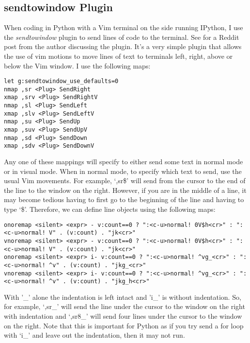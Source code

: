 \documentclass[10pt]{article}
\begin{document}
\subsection{sendtowindow Plugin}
When coding in Python with a Vim terminal on the side running IPython, I use the \textit{sendtowindow} plugin
\cite{KKPMW2016send} to send lines of code to the terminal. See \cite{KKPMW2019send} for a Reddit post from the author
discussing the plugin. It's a very simple plugin that allows the use of vim motions to move lines of text to terminals
left, right, above or below the Vim window. I use the following maps:\\
\begin{lstlisting}
let g:sendtowindow_use_defaults=0
nmap ,sr <Plug> SendRight
xmap ,srv <Plug> SendRightV
nmap ,sl <Plug> SendLeft
xmap ,slv <Plug> SendLeftV
nmap ,su <Plug> SendUp
xmap ,suv <Plug> SendUpV
nmap ,sd <Plug> SendDown
xmap ,sdv <Plug> SendDownV
\end{lstlisting}
Any one of these mappings will specify to either send some text in normal mode or in visual mode. When in normal mode,
to specify which text to send, use the usual Vim movements. For example, `,sr\$' will send from the cursor to the end
of the line to the window on the right. However, if you are in the middle of a line, it may become tedious having to
first go to the beginning of the line and having to type `\$'. Therefore, we can define line objects using the
following maps:
\begin{lstlisting}
onoremap <silent> <expr> - v:count==0 ? ":<c-u>normal! 0V$h<cr>" : ":<c-u>normal! V" . (v:count) . "jk<cr>"
vnoremap <silent> <expr> - v:count==0 ? ":<c-u>normal! 0V$h<cr>" : ":<c-u>normal! V" . (v:count) . "jk<cr>"
onoremap <silent> <expr> i- v:count==0 ? ":<c-u>normal! ^vg_<cr>" : ":<c-u>normal! ^v" . (v:count) . "jkg_<cr>"
vnoremap <silent> <expr> i- v:count==0 ? ":<c-u>normal! ^vg_<cr>" : ":<c-u>normal! ^v" . (v:count) . "jkg_h<cr>"
\end{lstlisting}
With '\_' alone the indentation is left intact and 'i\_' is without indentation. So, for example, `,sr\_' will send
the line under the cursor to the window on the right with indentation and `,sr8\_' will send four lines under the
cursor to the window on the right. Note that this is important for Python as if you try send a for loop with `i\_' and
leave out the indentation, then it may not run.

\end{document}
